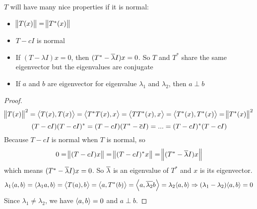 \begin{theorem}
    $T$ will have many nice properties if it is normal:
\begin{itemize}
    \item $\norm{T(x)} = \norm{T^* (x)}$
    \item $T - cI$ is normal
    \item If $(T - \lambda I)x = 0$, then $(T^* - \overline{\lambda}I)x = 0$. So $T$ and $T^*$ share the same eigenvector but the eigenvalues are conjugate
    \item If $a$ and $b$ are eigenvector for eigenvalue $\lambda_1$ and $\lambda_2$, then $a \perp b$\label{normal_eigenvectors_are_orthogonal}
\end{itemize}
\end{theorem}
\begin{proof}
    \begin{equation*}
        \norm{T(x)}^2 = \innerproduct{T(x)}{T(x)} = \innerproduct{T^*T(x)}{x} = \innerproduct{TT^*(x)}{x} = \innerproduct{T^*(x)}{T^*(x)} = \norm{T^*(x)}^2
    \end{equation*}
    \begin{equation*}
        (T-cI)(T-cI)^* = (T-cI)(T^* - \overline{c}I) = ... = (T-cI)^*(T-cI)
    \end{equation*}
    Because $T-cI$ is normal when $T$ is normal, so
    \begin{equation*}
        0 = \norm{(T-cI)x} = \norm{(T-cI)^* x} =  \norm{(T^*- \overline{\lambda} I)x}
    \end{equation*}
    which means $(T^*- \overline{\lambda} I)x = 0$. So $\overline{\lambda}$ is an eigenvalue of $T^*$ and $x$ is its eigenvector.
    \begin{equation*}
        \lambda_1 \innerproduct{a}{b} = \innerproduct{\lambda_1 a}{b} = \innerproduct{T(a)}{b} = \innerproduct{a}{T^*(b)} = \innerproduct{a}{\conjugate{\lambda_2}b} = \lambda_2 \innerproduct{a}{b} \Rightarrow (\lambda_1 - \lambda_2)\innerproduct{a}{b} = 0
    \end{equation*}
    Since $\lambda_1 \neq \lambda_2$, we have $\innerproduct{a}{b} = 0$ and $a \perp b$.
\end{proof}


